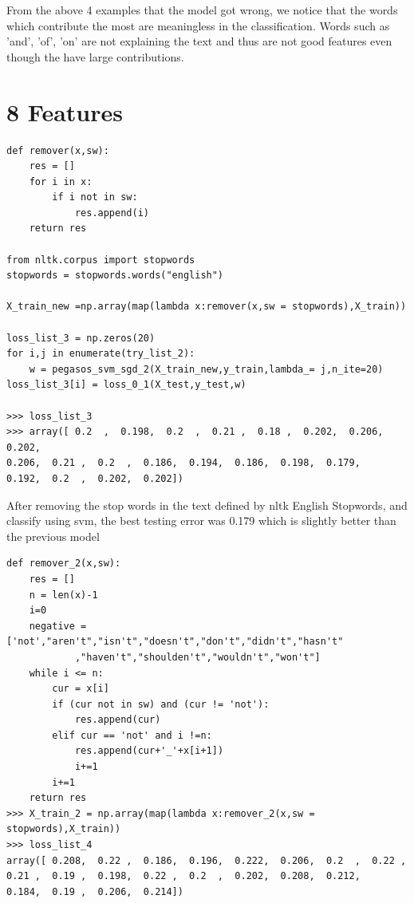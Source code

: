 \documentclass{article}
\newenvironment{sub}[2][$-$]{\begin{trivlist}
		\item[\hskip \labelsep {\bfseries #1}\hskip \labelsep {\bfseries #2.}]}  {\end{trivlist}}
\begin{document}
From the above 4 examples that the model got wrong, we notice that the words which contribute the most are meaningless in the classification. Words such as 'and', 'of', 'on' are not explaining the text and thus are not good features even though the have large contributions. 

\section{8 Features}
\begin{sub}{8.1 Removing stop words}
\end{sub}

\begin{verbatim}
def remover(x,sw):
	res = []
	for i in x:
		if i not in sw:
			res.append(i)
	return res

from nltk.corpus import stopwords
stopwords = stopwords.words("english")

X_train_new =np.array(map(lambda x:remover(x,sw = stopwords),X_train))

loss_list_3 = np.zeros(20)
for i,j in enumerate(try_list_2):
	w = pegasos_svm_sgd_2(X_train_new,y_train,lambda_= j,n_ite=20)
loss_list_3[i] = loss_0_1(X_test,y_test,w)

>>> loss_list_3
>>> array([ 0.2  ,  0.198,  0.2  ,  0.21 ,  0.18 ,  0.202,  0.206,  0.202,
0.206,  0.21 ,  0.2  ,  0.186,  0.194,  0.186,  0.198,  0.179,
0.192,  0.2  ,  0.202,  0.202])
\end{verbatim}

After removing the stop words in the text defined by nltk English Stopwords, and classify using svm, the best testing error was 0.179 which is slightly better than the previous model 

\pagebreak

\begin{sub}{8.2 Combine negations}
\end{sub}

\begin{verbatim}
def remover_2(x,sw):
	res = []
	n = len(x)-1
	i=0
	negative = ['not',"aren't","isn't","doesn't","don't","didn't","hasn't"
			,"haven't","shoulden't","wouldn't","won't"]
	while i <= n:
		cur = x[i]
		if (cur not in sw) and (cur != 'not'):
			res.append(cur)
		elif cur == 'not' and i !=n:
			res.append(cur+'_'+x[i+1])
			i+=1
		i+=1
	return res
>>> X_train_2 = np.array(map(lambda x:remover_2(x,sw = stopwords),X_train))
>>> loss_list_4
array([ 0.208,  0.22 ,  0.186,  0.196,  0.222,  0.206,  0.2  ,  0.22 ,
0.21 ,  0.19 ,  0.198,  0.22 ,  0.2  ,  0.202,  0.208,  0.212,
0.184,  0.19 ,  0.206,  0.214])
\end{verbatim}
\end{document}
